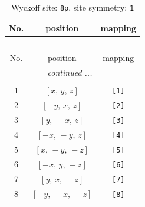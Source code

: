 \documentclass[fleqn,8pt]{jsarticle}
\begin{document}
\renewcommand{\arraystretch}{1.2}
\begin{longtable}{ccc}
\caption{Wyckoff site: {\tt 8p}, site symmetry: {\tt 1}}
 \\
 \hline \hline
No. & position & mapping \\ \hline \endfirsthead

\multicolumn{2}{l}{\tablename\ \thetable{}} \\
 \hline \hline
No. & position & mapping \\ \hline \endhead

 \hline \hline
\multicolumn{2}{r}{\footnotesize\it continued ...} \\ \endfoot

 \hline \hline
\multicolumn{2}{r}{} \\ \endlastfoot

1 & $\left[ x,\, y,\, z \right]$ & {\tt [1]} \\ \hline
2 & $\left[ - y,\, x,\, z \right]$ & {\tt [2]} \\ \hline
3 & $\left[ y,\, - x,\, z \right]$ & {\tt [3]} \\ \hline
4 & $\left[ - x,\, - y,\, z \right]$ & {\tt [4]} \\ \hline
5 & $\left[ x,\, - y,\, - z \right]$ & {\tt [5]} \\ \hline
6 & $\left[ - x,\, y,\, - z \right]$ & {\tt [6]} \\ \hline
7 & $\left[ y,\, x,\, - z \right]$ & {\tt [7]} \\ \hline
8 & $\left[ - y,\, - x,\, - z \right]$ & {\tt [8]} \\
\end{longtable}
\end{document}
